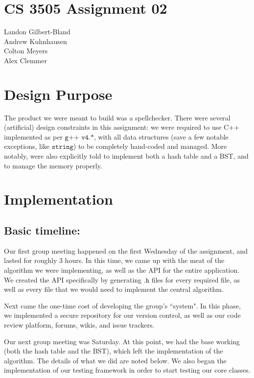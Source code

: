 \documentclass[a4paper]{article}
\begin{document}
\section*{CS 3505 Assignment 02}
Landon Gilbert-Bland\\
Andrew Kuhnhausen\\
Colton Meyers\\
Alex Clemmer\\

\section{Design Purpose}

The product we were meant to build was a spellchecker. There were several (artificial) design constraints in this assignment: we were required to use C++ implemented as per $\texttt{g++ v4.*}$, with all data structures (save a few notable exceptions, like $\texttt{string}$) to be completely hand-coded and managed. More notably, were also explicitly told to implement both a hash table and a BST, and to manage the memory properly.

\section{Implementation}

\subsection*{Basic timeline:}

Our first group meeting happened on the first Wednesday of the assignment, and lasted for roughly 3 hours. In this time, we came up with the meat of the algorithm we were implementing, as well as the API for the entire application. We created the API specifically by generating $\texttt{.h}$ files for every required file, as well as every file that we would need to implement the central algorithm.

Next came the one-time cost of developing the group's ``system". In this phase, we implemented a secure repository for our version control, as well as our code review platform, forums, wikis, and issue trackers.

Our next group meeting was Saturday. At this point, we had the base working (both the hash table and the BST), which left the implementation of the algorithm. The details of what we did are noted below. We also began the implementation of our testing framework in order to start testing our core classes.
\end{document}
